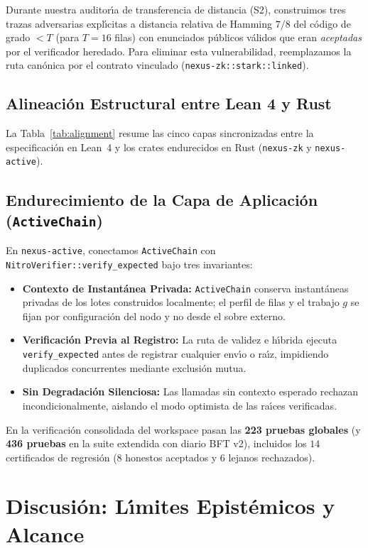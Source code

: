 \documentclass[conference]{IEEEtran}
\theoremstyle{definition}
\begin{document}
Durante nuestra auditor\'{\i}a de transferencia de distancia (S2), construimos tres trazas adversarias expl\'{\i}citas a distancia relativa de Hamming $7/8$ del c\'{o}digo de grado $< T$ (para $T = 16$ filas) con enunciados p\'{u}blicos v\'{a}lidos que eran \emph{aceptadas} por el verificador heredado. Para eliminar esta vulnerabilidad, reemplazamos la ruta can\'{o}nica por el contrato vinculado (\texttt{nexus-zk::stark::linked}).

\subsection{Alineaci\'{o}n Estructural entre Lean 4 y Rust}
La Tabla~\ref{tab:alignment} resume las cinco capas sincronizadas entre la especificaci\'{o}n en Lean~4 y los crates endurecidos en Rust (\texttt{nexus-zk} y \texttt{nexus-active}).

\subsection{Endurecimiento de la Capa de Aplicaci\'{o}n (\texttt{ActiveChain})}
En \texttt{nexus-active}, conectamos \texttt{ActiveChain} con \texttt{NitroVerifier::verify\_expected} bajo tres invariantes:
\begin{itemize}
    \setlength{\itemsep}{2pt}
    \item \textbf{Contexto de Instant\'{a}nea Privada:} \texttt{ActiveChain} conserva instant\'{a}neas privadas de los lotes construidos localmente; el perfil de filas y el trabajo $g$ se fijan por configuraci\'{o}n del nodo y no desde el sobre externo.
    \item \textbf{Verificaci\'{o}n Previa al Registro:} La ruta de validez e h\'{\i}brida ejecuta \texttt{verify\_expected} antes de registrar cualquier env\'{\i}o o ra\'{\i}z, impidiendo duplicados concurrentes mediante exclusi\'{o}n mutua.
    \item \textbf{Sin Degradaci\'{o}n Silenciosa:} Las llamadas sin contexto esperado rechazan incondicionalmente, aislando el modo optimista de las ra\'{\i}ces verificadas.
\end{itemize}

En la verificaci\'{o}n consolidada del workspace pasan las \textbf{223 pruebas globales} (y \textbf{436 pruebas} en la suite extendida con diario BFT v2), incluidos los $14$ certificados de regresi\'{o}n ($8$ honestos aceptados y $6$ lejanos rechazados).

\section{Discusi\'{o}n: L\'{\i}mites Epist\'{e}micos y Alcance}
\label{sec:limitations}
\end{document}
